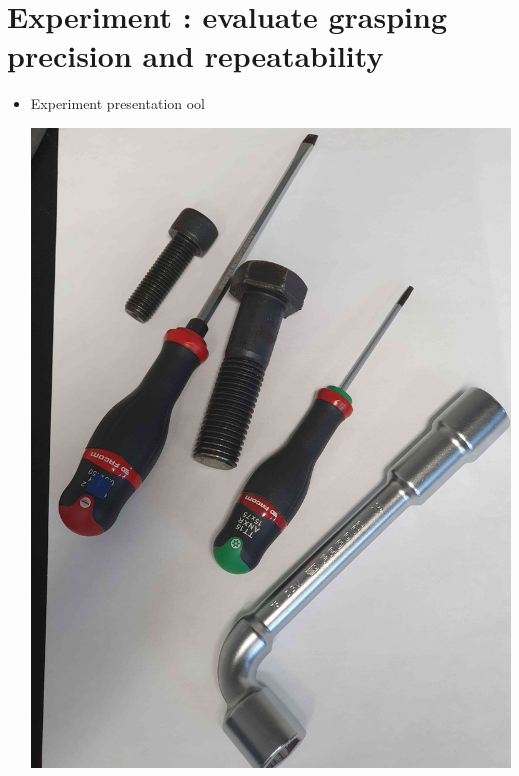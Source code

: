 \documentclass[11pt]{article}
\author{helenon}
\date{\today}
\title{}
\begin{document}
\section*{Experiment : evaluate grasping precision and repeatability}
\label{sec:org1f6fba8}

\begin{itemize}
\item Experiment presentation
\label{sec:org8494474}
ool
\begin{center}
\includegraphics[width=.9\linewidth]{./jeu-outils.jpg}
\label{fig:outils}
\end{center}



\end{itemize}
\end{document}
